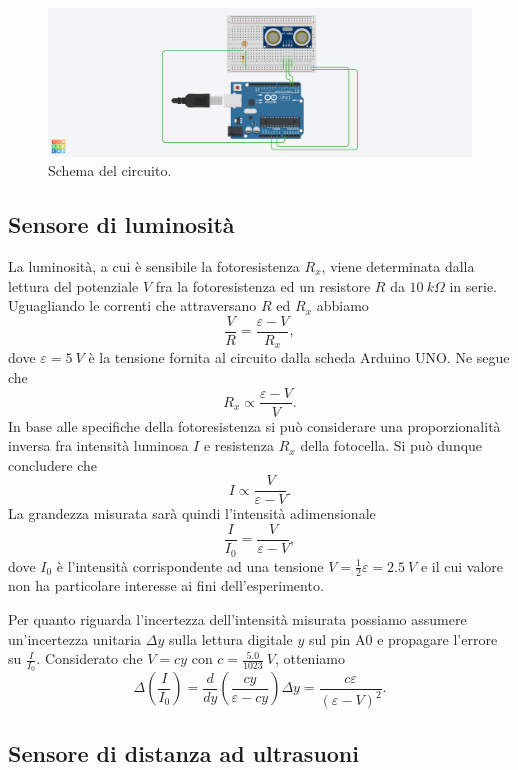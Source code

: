 \documentclass[11pt]{article}
\makeatletter
\def\maxwidth{\ifdim\Gin@nat@width>\linewidth\linewidth
    \else\Gin@nat@width\fi}
\let\Oldincludegraphics\includegraphics
\renewcommand{\includegraphics}[1]{\Oldincludegraphics[width=.8\maxwidth]{#1}}
\makeatother
\begin{document}
\begin{figure}[H]
  \centering
  \includegraphics{img/schema.png}
  \caption{Schema del circuito.\label{fig:schema}}
\end{figure}

\hypertarget{sensore-di-luminosituxe0}{%
\subsection{Sensore di luminosità}\label{sensore-di-luminosituxe0}}

La luminosità, a cui è sensibile la fotoresistenza \(R_x\), viene
determinata dalla lettura del potenziale \(V\) fra la fotoresistenza ed
un resistore \(R\) da \(10\:k\Omega\) in serie. Uguagliando le correnti
che attraversano \(R\) ed \(R_x\) abbiamo
\[\frac{V}{R}=\frac{\varepsilon-V}{R_x},\] dove \(\varepsilon=5\:V\) è
la tensione fornita al circuito dalla scheda Arduino UNO. Ne segue che
\[R_x\propto \frac{\varepsilon-V}{V}.\] In base alle specifiche della
fotoresistenza si può considerare una proporzionalità inversa fra
intensità luminosa \(I\) e resistenza \(R_x\) della fotocella. Si può
dunque concludere che \[I\propto \frac{V}{\varepsilon-V}.\] La grandezza
misurata sarà quindi l'intensità adimensionale
\[\frac{I}{I_0}=\frac{V}{\varepsilon-V},\] dove \(I_0\) è l'intensità
corrispondente ad una tensione \(V=\frac{1}{2}\varepsilon=2.5\:V\) e il
cui valore non ha particolare interesse ai fini dell'esperimento.

Per quanto riguarda l'incertezza dell'intensità misurata possiamo
assumere un'incertezza unitaria \(\Delta y\) sulla lettura digitale
\(y\) sul pin A0 e propagare l'errore su \(\frac{I}{I_0}\). Considerato
che \(V=cy\) con \(c=\frac{5.0}{1023}\:V\), otteniamo
\[\Delta\left(\frac{I}{I_0}\right)=\frac{d}{d y}\left(\frac{cy}{\varepsilon-cy}\right)\Delta y=\frac{c\varepsilon}{(\varepsilon-V)^2}.\]

\hypertarget{sensore-di-distanza-ad-ultrasuoni}{%
\subsection{Sensore di distanza ad
ultrasuoni}\label{sensore-di-distanza-ad-ultrasuoni}}
\end{document}
